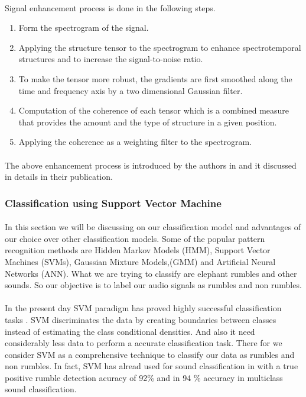\documentclass[12pt]{article}
\numberwithin{figure}{section}
\numberwithin{table}{section}
\begin{document}
\paragraph{}
Signal enhancement process is done in the following steps.

\begin{enumerate}
  \item Form the spectrogram of the signal.
  \item Applying the structure tensor to the spectrogram to enhance spectrotemporal
structures and to increase the signal-to-noise ratio.
  \item To make the tensor more robust, the gradients are first smoothed along the time and frequency axis by a
two dimensional Gaussian filter.
  \item Computation of the coherence of each tensor which is a combined measure that provides the amount and the type of structure in a given position.
  \item Applying the coherence as a weighting filter to the spectrogram.
\end{enumerate}

\paragraph{}
The above enhancement process is introduced by the authors in \cite{11} and it discussed in details in their publication.

\subsubsection{Classification using Support Vector Machine}
\paragraph{}
In this section we will be discussing on our classification model and advantages of our choice over other classification models. Some of the popular pattern recognition methods are Hidden Markov Models (HMM), Support Vector Machines (SVMs), Gaussian Mixture Models,(GMM) and Artificial Neural Networks (ANN). What we are trying to classify are elephant rumbles and other sounds. So our objective is to label our audio signals as rumbles and non rumbles.  

\paragraph{}
In the present day SVM paradigm has proved highly successful classification tasks \cite{39}. SVM discriminates the data by creating boundaries between classes instead of estimating the class conditional densities. And also it need considerably less data to perform a accurate classification task. There for we consider SVM as a comprehensive technique to classify our data as rumbles and non rumbles. In fact, SVM has alread used for sound classification in \cite{11} with a true positive rumble detection acuracy of 92\% and in \cite{40} 94 \% accuracy in multiclass sound classification. 
\end{document}
